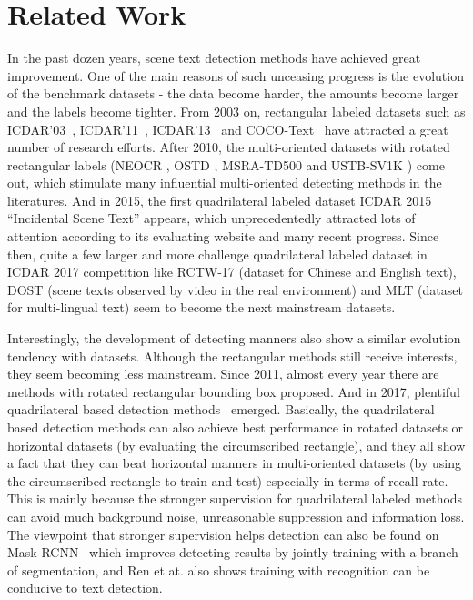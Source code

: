 \documentclass[10pt,twocolumn,letterpaper]{article}
\begin{document}
\section{Related Work}
In the past dozen years, scene text detection methods have achieved great improvement.
One of the main reasons of such unceasing progress is the evolution of the benchmark datasets - the data become harder, the amounts become larger and the labels become tighter. From 2003 on, rectangular labeled datasets such as ICDAR'03~\cite{lucas2003icdar}, ICDAR'11~\cite{shahab2011icdar}, ICDAR'13~\cite{Karatzas2013ICDAR} and COCO-Text~\cite{veit2016coco} have attracted a great number of research efforts. After 2010, the multi-oriented datasets with rotated rectangular labels (NEOCR \cite{nagy2011neocr}, OSTD \cite{yi2011text}, MSRA-TD500 \cite{Yao2012Detecting} and USTB-SV1K \cite{Yin2015Multi}) come out, which stimulate many influential multi-oriented detecting methods in the literatures. And in 2015, the first quadrilateral labeled dataset ICDAR 2015 ``Incidental Scene Text'' \cite{karatzas2015icdar} appears, which unprecedentedly attracted lots of attention according to its evaluating website \cite{karatzas2015icdar} and many recent progress.
 Since then, quite a few larger and more challenge quadrilateral labeled dataset in ICDAR 2017 competition like RCTW-17 \cite{Shi2017ICDAR2017} (dataset for Chinese and English text), DOST \cite{dost2017icdar} (scene texts observed by video in the real environment) and MLT \cite{mlt2017icdar} (dataset for multi-lingual text) seem to become the next mainstream datasets.

Interestingly, the development of detecting manners also show a similar evolution tendency with datasets.
Although the rectangular methods still receive interests, they seem becoming less mainstream. Since 2011, almost every year there are methods with rotated rectangular bounding box proposed. And in 2017, plentiful quadrilateral based detection methods~\cite{liu2017deep,shi2017detecting,zhou2017east,he2017deep,dai2017fused} emerged. Basically, the quadrilateral based detection methods can also achieve best performance in rotated datasets or horizontal datasets (by evaluating the circumscribed rectangle), and they all show a fact that they can beat horizontal manners in multi-oriented datasets (by using the circumscribed rectangle to train and test) especially in terms of recall rate. This is mainly because the stronger supervision for quadrilateral labeled methods can avoid much background noise, unreasonable suppression and information loss. The viewpoint that stronger supervision helps detection can also be found on Mask-RCNN~\cite{He2017Mask} which improves detecting results by jointly training with a branch of segmentation, and Ren et at. \cite{li2017towards} also shows training with recognition can be conducive to text detection.
\end{document}
